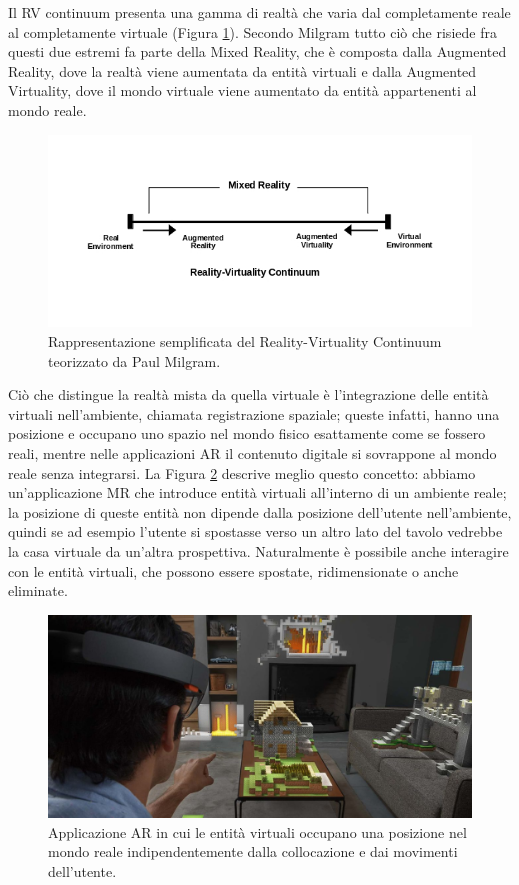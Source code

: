 Il RV continuum presenta una gamma di realtà che varia dal completamente reale al completamente virtuale (Figura \ref{fig:figure13}).
Secondo Milgram tutto ciò che risiede fra questi due estremi fa parte della Mixed Reality, che è composta dalla Augmented Reality, dove la realtà viene aumentata da entità virtuali e dalla Augmented Virtuality, dove il mondo virtuale viene aumentato da entità appartenenti al mondo reale.
\begin{figure}[t]
    \centering
    \includegraphics[width=\textwidth]{images/RV-continuum.jpg}
    \caption{Rappresentazione semplificata del Reality-Virtuality Continuum teorizzato da Paul Milgram.}
    \label{fig:figure13}
\end{figure}

Ciò che distingue la realtà mista da quella virtuale è l'integrazione delle entità virtuali nell'ambiente, chiamata registrazione spaziale; queste infatti, hanno una posizione e occupano uno spazio nel mondo fisico esattamente come se fossero reali, mentre nelle applicazioni AR il contenuto digitale si sovrappone al mondo reale senza integrarsi.
La Figura \ref{fig:figure14} descrive meglio questo concetto: abbiamo un’applicazione MR che introduce entità virtuali all’interno di un ambiente reale; 
la posizione di queste entità non dipende dalla posizione dell’utente nell’ambiente, quindi se ad esempio l’utente si spostasse verso un altro lato del tavolo vedrebbe la casa virtuale da un’altra prospettiva. 
Naturalmente è possibile anche interagire con le entità virtuali, che possono essere spostate, ridimensionate o anche eliminate.

\begin{figure}[t]
    \centering
    \includegraphics[width=\textwidth]{images/hololens-ar.jpg}
    \caption{Applicazione AR in cui le entità virtuali occupano una posizione nel mondo reale indipendentemente dalla collocazione e dai movimenti dell’utente.}
    \label{fig:figure14}
\end{figure}

